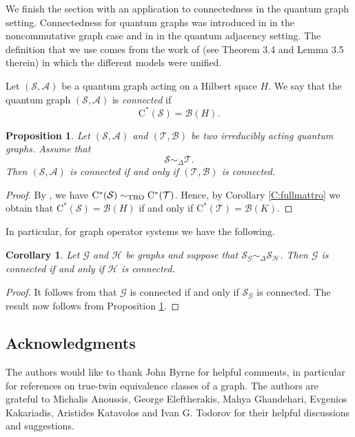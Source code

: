\documentclass[11pt]{amsart}
\numberwithin{equation}{section}
\theoremstyle{plain}
\newtheorem{corollary}[theorem]{Corollary}
\newtheorem{proposition}[theorem]{Proposition}
\theoremstyle{definition}
\theoremstyle{remark}
\newcommand{\A}{{\mathcal{A}}}
\newcommand{\B}{{\mathcal{B}}}
\newcommand{\G}{{\mathcal{G}}}
\renewcommand{\H}{{\mathcal{H}}}
\renewcommand{\S}{{\mathcal{S}}}
\newcommand{\T}{{\mathcal{T}}}
\newcommand{\ca}{\mathrm{C}^*}
\begin{document}
We finish the section with an application to connectedness in the quantum graph setting. Connectedness for quantum graphs was introduced in \cite{CDS21} in the noncommutative graph case and in \cite{Mat24} in the quantum adjacency setting.  The  definition that we use comes from the work of  \cite{CGW25} (see Theorem 3.4 and  Lemma 3.5 therein)  in which the different models were unified. 

Let $(\S,\A)$ be a quantum graph acting on a Hilbert space $H$. We say that the quantum graph
$(\S,\A)$ is \emph{connected} if
\[
\ca(\S)= \B(H).
\]

\begin{proposition}\label{P:connec}
Let $(\S,\A)$ and $ (\T,\B)$ be two irreducibly acting quantum graphs. Assume that
\[
\S \sim_{\Delta} \T.
\]
Then $(\S,\A)$ is connected if and only if $(\T,\B)$ is connected.
\end{proposition}

\begin{proof}
By \cite[Proposition 7.5]{EKT21},  we have $ \ca(\S) \sim_{\rm TRO} \ca(\T)$. Hence, by Corollary \ref{C:fullmattro} we obtain that $\ca(\S)= \B(H)$ if and only if $\ca(\T)= \B(K)$.
\end{proof}

In particular, for graph operator systems we have the following.

\begin{corollary}
Let $\G$ and $\H$ be graphs and suppose that $\S_{\G}\sim_{\Delta}\S_{\H}$. Then $\G$ is connected if and only if $\H$ is connected.
\end{corollary}

\begin{proof}
It follows from \cite[Corollary 3.4]{CDS21} that $\G$ is connected if and only if $\S_{\G}$ is connected.
The result now follows from Proposition \ref{P:connec}.
\end{proof}


\subsection*{Acknowledgments} The authors would like to thank John Byrne for helpful comments, in particular for references on true-twin equivalence classes of a graph. The authors are grateful to Michalis Anoussis, George Eleftherakis, Mahya Ghandehari, Evgenios Kakariadis, Aristides Katavolos and Ivan G. Todorov for their helpful discussions and suggestions.
\end{document}
